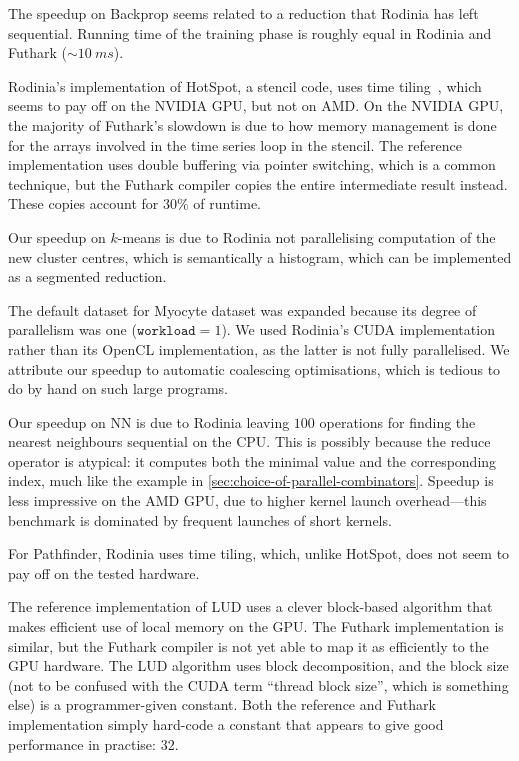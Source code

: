 The speedup on Backprop seems related to a reduction that Rodinia has
left sequential.  Running time of the training phase is roughly equal
in Rodinia and Futhark ($\sim10~ms$).

Rodinia's implementation of HotSpot, a stencil code, uses time
tiling~\cite{HexaTiling}, which seems to pay off on the NVIDIA GPU,
but not on AMD.  On the NVIDIA GPU, the majority of Futhark's slowdown
is due to how memory management is done for the arrays involved in the
time series loop in the stencil.  The reference implementation uses
double buffering via pointer switching, which is a common technique,
but the Futhark compiler copies the entire intermediate result
instead.  These copies account for $30\%$ of runtime.

Our speedup on $k$-means is due to Rodinia not parallelising
computation of the new cluster centres, which is semantically a
histogram, which can be implemented as a segmented reduction.

The default dataset for Myocyte dataset was expanded because its
degree of parallelism was one ($\texttt{workload}=1$).  We used
Rodinia's CUDA implementation rather than its OpenCL implementation,
as the latter is not fully parallelised.  We attribute our speedup to
automatic coalescing optimisations, which is tedious to do by hand on
such large programs.

Our speedup on NN is due to Rodinia leaving $100$ 
operations for finding the nearest neighbours sequential on the CPU.
This is possibly because the reduce operator is atypical: it computes
both the minimal value and the corresponding index, much like the
example in \cref{sec:choice-of-parallel-combinators}.  Speedup is less
impressive on the AMD GPU, due to higher kernel launch overhead---this
benchmark is dominated by frequent launches of short kernels.

For Pathfinder, Rodinia uses time tiling, which, unlike HotSpot, does
not seem to pay off on the tested hardware.

The reference implementation of LUD uses a clever block-based
algorithm that makes efficient use of local memory on the GPU.  The
Futhark implementation is similar, but the Futhark compiler is not yet
able to map it as efficiently to the GPU hardware.  The LUD algorithm
uses block decomposition, and the block size (not to be confused with
the CUDA term ``thread block size'', which is something else) is a
programmer-given constant.  Both the reference and Futhark
implementation simply hard-code a constant that appears to give good
performance in practise: $32$.

